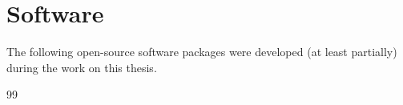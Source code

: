 {}
\chapter*{Software}
The following open-source software packages were developed (at least partially) during the work
on this thesis.

\begin{refsection}[ownsoft]
    \small
    \nocite{*} %
    { %
      \expandafter\def\csname blx@maxbibnames\endcsname{99}%
      \printbibliography[heading=none]
    }
\end{refsection}

